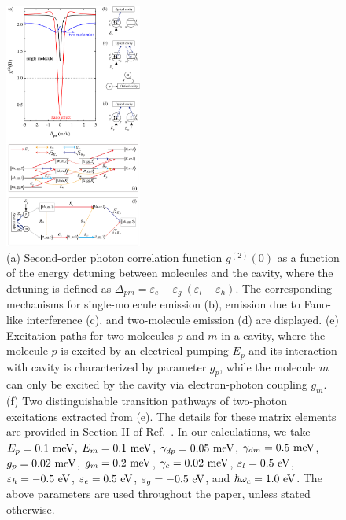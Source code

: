 \documentclass[aps,prb,
superscriptaddress,
,twocolumn
,floatfix,footinbib,longbibliography,
]{revtex4-2}
\begin{document}
\begin{figure}[h]
\centering
\includegraphics[width=0.4\textwidth]{fano-compare-mix.pdf}
\caption{(a) Second-order photon correlation function $g^{(2)}(0)$ as a function of the energy detuning between molecules and the cavity, where the detuning is defined as $\Delta_{pm}=\varepsilon_{e}-\varepsilon_{g}~(\varepsilon_{l}-\varepsilon_{h})$.
The corresponding mechanisms for single-molecule emission (b), emission due to Fano-like interference (c), and two-molecule emission (d) are displayed. 
(e) Excitation paths for two molecules $p$ and $m$ in a cavity, where the molecule $p$ is excited by an electrical pumping $E_{p}$ and its interaction with cavity is characterized by parameter $g_{p}$, while the molecule $m$ can only be excited by the cavity via electron-photon coupling $g_{m}$. (f) Two distinguishable transition pathways of two-photon excitations extracted from (e). The details for these matrix elements are provided in Section II of Ref.~\cite{SupplementalMaterial}. In our calculations,
we take $E_{p}=0.1~{\rm meV}$, $E_{m}=0.1~{\rm meV}$, $\gamma_{dp}=0.05~{\rm meV}$, $\gamma_{dm}=0.5~{\rm meV}$, $g_{p}=0.02~{\rm meV}$, $g_{m}=0.2~{\rm meV}$, $\gamma_{c}=0.02~{\rm meV}$, $\varepsilon_{l}=0.5~{\rm eV}$, $\varepsilon_{h}=-0.5~{\rm eV}$, $\varepsilon_{e}=0.5~{\rm eV}$, $\varepsilon_{g}=-0.5~{\rm eV}$, and $\hbar\omega_{c}=1.0~{\rm eV}$.
The above parameters are used throughout the paper, unless stated otherwise.}
\label{fano-compare}
\end{figure}
\end{document}
